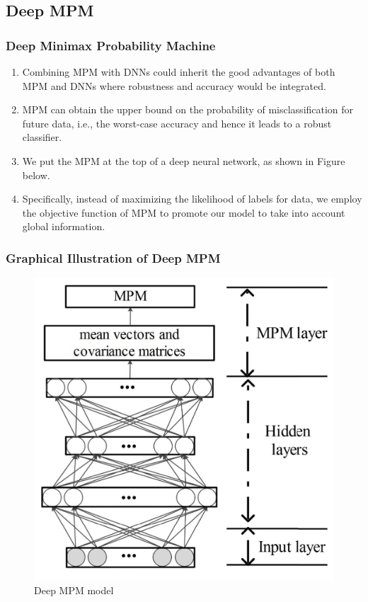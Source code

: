\documentclass{beamer}
\begin{document}
\subsection*{Deep MPM}
\begin{frame}[fragile]
\frametitle{Deep Minimax Probability Machine}
\begin{enumerate}
    \item Combining MPM with DNNs could inherit the good
advantages of both MPM and DNNs where robustness and
accuracy would be integrated.
    \item  MPM can obtain the upper bound on
the probability of misclassification for future data, i.e., the
worst-case accuracy and hence it leads to a robust classifier.
\item We put the MPM at the top of a deep
neural network, as shown in Figure below.
\item Specifically, instead of maximizing
the likelihood of labels for data, we employ the objective
function of MPM to promote our model to take into account
global information.
\end{enumerate}

\end{frame}
\begin{frame}[fragile]
\frametitle{Graphical Illustration of Deep MPM}
\begin{figure}
    \includegraphics[scale=0.19]{figure_research_paper.jpeg}
    \caption{Deep MPM model}
\end{figure}

\end{frame}
\end{document}
